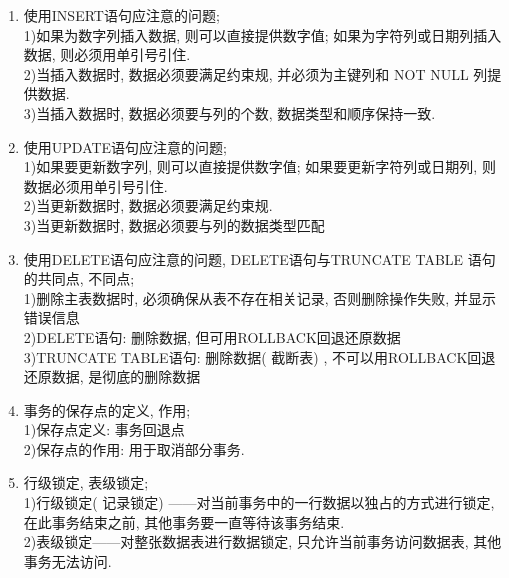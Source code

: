 \documentclass{article}                     %
\numberwithin{equation}{section}            %
\numberwithin{figure}{section}              %
\numberwithin{table}{section}               %
\begin{document}
\begin{enumerate}
\item 使用INSERT语句应注意的问题; \\
1)如果为数字列插入数据, 则可以直接提供数字值; 如果为字符列或日期列插入数据, 则必须用单引号引住. \\
2)当插入数据时, 数据必须要满足约束规, 并必须为主键列和 NOT NULL 列提供数据. \\
3)当插入数据时, 数据必须要与列的个数, 数据类型和顺序保持一致. \\



\item 使用UPDATE语句应注意的问题; \\
1)如果要更新数字列, 则可以直接提供数字值; 如果要更新字符列或日期列, 则数据必须用单引号引住. \\
2)当更新数据时, 数据必须要满足约束规. \\
3)当更新数据时, 数据必须要与列的数据类型匹配\\



\item 使用DELETE语句应注意的问题, DELETE语句与TRUNCATE TABLE 语句的共同点, 不同点; \\
1)删除主表数据时, 必须确保从表不存在相关记录, 否则删除操作失败, 并显示错误信息\\
2)DELETE语句: 删除数据, 但可用ROLLBACK回退还原数据\\
3)TRUNCATE TABLE语句: 删除数据( 截断表) , 不可以用ROLLBACK回退还原数据, 是彻底的删除数据\\


\item 事务的保存点的定义, 作用; \\
1)保存点定义: 事务回退点\\
2)保存点的作用: 用于取消部分事务. \\


\item 行级锁定, 表级锁定; \\
1)行级锁定( 记录锁定) ——对当前事务中的一行数据以独占的方式进行锁定, 在此事务结束之前, 其他事务要一直等待该事务结束. \\
2)表级锁定——对整张数据表进行数据锁定, 只允许当前事务访问数据表, 其他事务无法访问. \\




\end{enumerate}
\end{document}
